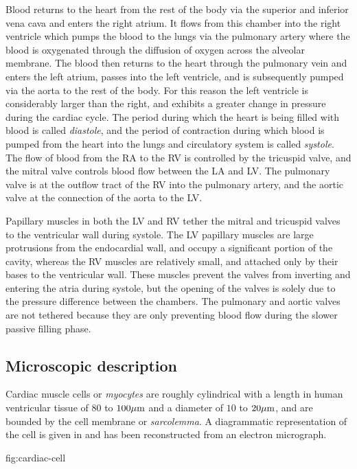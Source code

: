 Blood returns to the heart from the rest of the body via the superior and
inferior vena cava and enters the right atrium.  It flows from this chamber
into the right ventricle which pumps the blood to the lungs via the pulmonary
artery where the blood is oxygenated through the diffusion of oxygen across
the alveolar membrane.  The blood then returns to the heart through the
pulmonary vein and enters the left atrium, passes into the left ventricle, and
is subsequently pumped via the aorta to the rest of the body.  For this reason
the left ventricle is considerably larger than the right, and exhibits a
greater change in pressure during the cardiac cycle.  The period during which
the heart is being filled with blood is called \emph{diastole}, and the period
of contraction during which blood is pumped from the heart into the lungs and
circulatory system is called \emph{systole}.  The flow of blood from the RA to
the RV is controlled by the tricuspid valve, and the mitral valve controls
blood flow between the LA and LV.  The pulmonary valve is at the outflow tract
of the RV into the pulmonary artery, and the aortic valve at the connection of
the aorta to the LV.

Papillary muscles in both the LV and RV tether the mitral and tricuspid valves
to the ventricular wall during systole.  The LV papillary muscles are large
protrusions from the endocardial wall, and occupy a significant portion of the
cavity, whereas the RV muscles are relatively small, and attached only by
their bases to the ventricular wall.  These muscles prevent the valves from
inverting and entering the atria during systole, but the opening of the valves
is solely due to the pressure difference between the chambers.  The pulmonary
and aortic valves are not tethered because they are only preventing blood flow
during the slower passive filling phase.

\subsection{Microscopic description}
\label{sec:microstructure}

Cardiac muscle cells or \emph{myocytes} are roughly cylindrical with a length
in human ventricular tissue of $80$ to $100 \mathrm{\mu m}$ and a diameter of $10$ to $20
\mathrm{\mu m}$, and are bounded by the cell membrane or \emph{sarcolemma}.  A
diagrammatic representation of the cell is given in 
and has been reconstructed from an electron micrograph.

 {fig:cardiac-cell}

